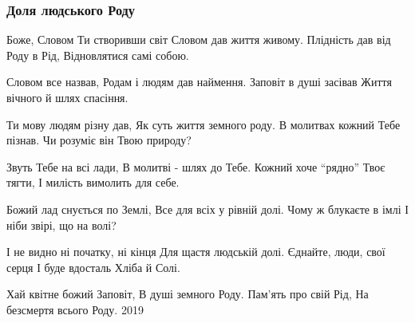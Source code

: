  
 
 

\subsubsection{Доля людського Роду}

Боже, Словом Ти створивши світ
Словом дав життя живому.
Плідність дав від Роду в Рід,
Відновлятися самі собою.

Словом все назвав,
Родам і людям дав наймення.
Заповіт в душі засівав
Життя вічного й шлях спасіння.

Ти мову людям різну дав,
Як суть життя земного роду.
В молитвах кожний Тебе пізнав.
Чи розуміє він Твою природу?

Звуть Тебе на всі лади,
В молитві - шлях до Тебе.
Кожний хоче “рядно” Твоє тягти,
І милість вимолить для себе.

Божий лад снується по Землі,
Все для всіх у рівній долі.
Чому ж блукаєте в імлі
І ніби звірі, що на волі?

І не видно ні початку, ні кінця
Для щастя людській долі.
Єднайте, люди, свої серця
І буде вдосталь Хліба й Солі.

Хай квітне божий Заповіт,
В душі земного Роду.
Пам'ять про свій Рід,
На безсмертя всього Роду.
2019 
